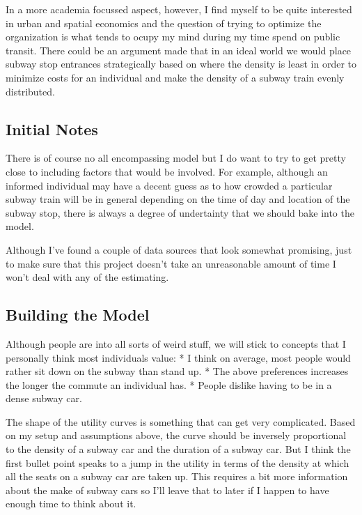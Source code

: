 \documentclass[11pt]{article}
\begin{document}
In a more academia focussed aspect, however, I find myself to be quite
interested in urban and spatial economics and the question of trying to
optimize the organization is what tends to ocupy my mind during my time
spend on public transit. There could be an argument made that in an
ideal world we would place subway stop entrances strategically based on
where the density is least in order to minimize costs for an individual
and make the density of a subway train evenly distributed.

    \hypertarget{initial-notes}{%
\subsection{Initial Notes}\label{initial-notes}}

There is of course no all encompassing model but I do want to try to get
pretty close to including factors that would be involved. For example,
although an informed individual may have a decent guess as to how
crowded a particular subway train will be in general depending on the
time of day and location of the subway stop, there is always a degree of
undertainty that we should bake into the model.

Although I've found a couple of data sources that look somewhat
promising, just to make sure that this project doesn't take an
unreasonable amount of time I won't deal with any of the estimating.

    \hypertarget{building-the-model}{%
\subsection{Building the Model}\label{building-the-model}}

Although people are into all sorts of weird stuff, we will stick to
concepts that I personally think most individuals value: * I think on
average, most people would rather sit down on the subway than stand up.
* The above preferences increases the longer the commute an individual
has. * People dislike having to be in a dense subway car.

The shape of the utility curves is something that can get very
complicated. Based on my setup and assumptions above, the curve should
be inversely proportional to the density of a subway car and the
duration of a subway car. But I think the first bullet point speaks to a
jump in the utility in terms of the density at which all the seats on a
subway car are taken up. This requires a bit more information about the
make of subway cars so I'll leave that to later if I happen to have
enough time to think about it.
\end{document}

